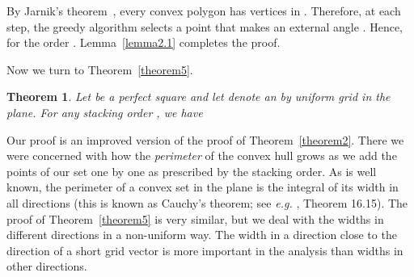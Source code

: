\documentclass[11pt]{article}
\newtheorem{thm}{Theorem}             \newtheorem{lem}[thm]{Lemma}
\begin{document}
By Jarnik's theorem~\cite{Ja25}, every convex polygon has  vertices in . Therefore, at each step, the greedy algorithm selects a point  that makes an external angle . Hence,  for the order . Lemma~\ref{lemma2.1} completes the proof.

Now we turn to Theorem~\ref{theorem5}.

{
\renewcommand{\thethm}{5}
\begin{thm}
Let  be a perfect square and let  denote an  by  uniform grid in the plane. For any stacking order , we have

\end{thm}
\addtocounter{thm}{-1}
}

Our proof is an improved version of the
proof of Theorem~\ref{theorem2}. There we were concerned with how the {\em perimeter} of the
convex hull grows as we add the points of our set one by one as prescribed by
the stacking order. As is well known, the perimeter of a convex set in the plane is the
integral of its width in all directions (this is known as Cauchy's theorem; see {\it e.g.} \cite{PaA95}, Theorem 16.15).
The proof of Theorem~\ref{theorem5} is very
similar, but we deal with the widths in different directions
in a non-uniform way. The width in a direction close to the
direction of a short grid vector is more important in the analysis than
widths in other directions.
\end{document}
